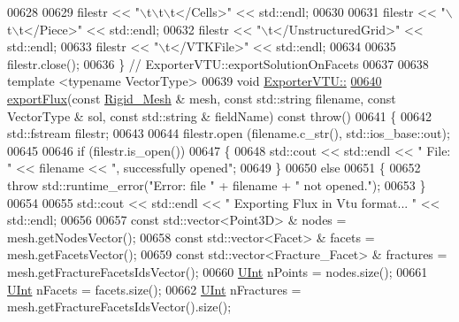\begin{DoxyCode}
00628 
00629     filestr << \textcolor{stringliteral}{"\(\backslash\)t\(\backslash\)t\(\backslash\)t</Cells>"} << std::endl;
00630 
00631     filestr << \textcolor{stringliteral}{"\(\backslash\)t\(\backslash\)t</Piece>"} << std::endl;
00632     filestr << \textcolor{stringliteral}{"\(\backslash\)t</UnstructuredGrid>"} << std::endl;
00633     filestr << \textcolor{stringliteral}{"\(\backslash\)t</VTKFile>"} << std::endl;
00634 
00635     filestr.close();
00636 \} \textcolor{comment}{// ExporterVTU::exportSolutionOnFacets}
00637 
00638 \textcolor{keyword}{template} <\textcolor{keyword}{typename} VectorType>
00639 \textcolor{keywordtype}{void} \hyperlink{classFVCode3D_1_1ExporterVTU_a8e6ee7a5a2bede11d9671d37e78651a4}{ExporterVTU::}
\hypertarget{ExportVTU_8hpp_source.tex_l00640}{}\hyperlink{classFVCode3D_1_1ExporterVTU_a8e6ee7a5a2bede11d9671d37e78651a4}{00640} \hyperlink{classFVCode3D_1_1ExporterVTU_a8e6ee7a5a2bede11d9671d37e78651a4}{exportFlux}(\textcolor{keyword}{const} \hyperlink{classFVCode3D_1_1Rigid__Mesh}{Rigid\_Mesh} & mesh, \textcolor{keyword}{const} std::string filename, \textcolor{keyword}{const} VectorType & sol,
       \textcolor{keyword}{const} std::string & fieldName) \textcolor{keyword}{const} \textcolor{keywordflow}{throw}()
00641 \{
00642     std::fstream filestr;
00643 
00644     filestr.open (filename.c\_str(), std::ios\_base::out);
00645 
00646     \textcolor{keywordflow}{if} (filestr.is\_open())
00647     \{
00648         std::cout << std::endl << \textcolor{stringliteral}{" File: "} << filename << \textcolor{stringliteral}{", successfully opened"};
00649     \}
00650     \textcolor{keywordflow}{else}
00651     \{
00652         \textcolor{keywordflow}{throw} std::runtime\_error(\textcolor{stringliteral}{"Error: file "} + filename + \textcolor{stringliteral}{" not opened."});
00653     \}
00654 
00655     std::cout << std::endl << \textcolor{stringliteral}{" Exporting Flux in Vtu format... "} << std::endl;
00656 
00657     \textcolor{keyword}{const} std::vector<Point3D> & nodes = mesh.getNodesVector();
00658     \textcolor{keyword}{const} std::vector<Facet> & facets = mesh.getFacetsVector();
00659     \textcolor{keyword}{const} std::vector<Fracture\_Facet> & fractures = mesh.getFractureFacetsIdsVector();
00660     \hyperlink{namespaceFVCode3D_a4bf7e328c75d0fd504050d040ebe9eda}{UInt} nPoints = nodes.size();
00661     \hyperlink{namespaceFVCode3D_a4bf7e328c75d0fd504050d040ebe9eda}{UInt} nFacets = facets.size();
00662     \hyperlink{namespaceFVCode3D_a4bf7e328c75d0fd504050d040ebe9eda}{UInt} nFractures = mesh.getFractureFacetsIdsVector().size();

\end{DoxyCode}
